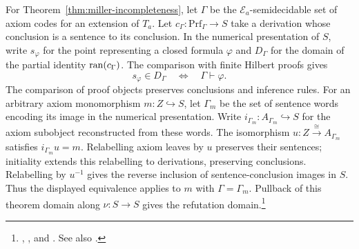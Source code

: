 For Theorem~\ref{thm:miller-incompleteness}, let $\Gamma$ be the
$\mathcal E_a$-semidecidable set of axiom codes for an extension
of $T_a$. Let $c_\Gamma:\mathrm{Prf}_\Gamma\to S$ take a derivation
whose conclusion is a sentence to its conclusion. In the numerical
presentation of $S$, write $s_\varphi$ for the point representing
a closed formula $\varphi$ and $D_\Gamma$ for the domain of the
partial identity $\operatorname{ran}(c_\Gamma)$. The comparison with finite Hilbert
proofs gives
\[
  s_\varphi\in D_\Gamma
    \quad\Longleftrightarrow\quad \Gamma\vdash\varphi .
\]
The comparison of proof objects preserves conclusions and inference
rules. For an arbitrary axiom monomorphism $m:Z\hookrightarrow S$,
let $\Gamma_m$ be the set of sentence words encoding its image in the
numerical presentation. Write $i_{\Gamma_m}:A_{\Gamma_m}\hookrightarrow S$
for the axiom subobject reconstructed from these words.
The isomorphism $u:Z\xrightarrow{\cong}A_{\Gamma_m}$ satisfies
$i_{\Gamma_m}u=m$. Relabelling axiom leaves by $u$ preserves their
sentences; initiality extends this relabelling to derivations, preserving
conclusions. Relabelling by $u^{-1}$ gives the reverse inclusion of
sentence-conclusion images in $S$. Thus the displayed equivalence applies to $m$
with $\Gamma=\Gamma_m$. Pullback of this theorem domain along
$\nu:S\to S$ gives the refutation domain.\footnote{%
,
, and
.
See also .}
